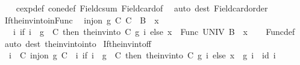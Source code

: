\begin{isabellebody}
%
\isadelimproof
\ \ %
\endisadelimproof
%
\isatagproof
{}\isamarkupfalse%
\ cexp{\isacharunderscore}{\kern0pt}def\ cone{\isacharunderscore}{\kern0pt}def\ Field{\isacharunderscore}{\kern0pt}csum\ Field{\isacharunderscore}{\kern0pt}card{\isacharunderscore}{\kern0pt}of\ \isamarkupfalse%
\ {\isacharparenleft}{\kern0pt}auto\ dest{\isacharcolon}{\kern0pt}\ Field{\isacharunderscore}{\kern0pt}card{\isacharunderscore}{\kern0pt}order{\isacharparenright}{\kern0pt}%
\endisatagproof
{\isafoldproof}%
%
\isadelimproof
\isanewline
%
\endisadelimproof
\isanewline
{}\isamarkupfalse%
\ If{\isacharunderscore}{\kern0pt}the{\isacharunderscore}{\kern0pt}inv{\isacharunderscore}{\kern0pt}into{\isacharunderscore}{\kern0pt}in{\isacharunderscore}{\kern0pt}Func{\isacharcolon}{\kern0pt}\isanewline
\ \ {\isachardoublequoteopen}{\isasymlbrakk}inj{\isacharunderscore}{\kern0pt}on\ g\ C{\isacharsemicolon}{\kern0pt}\ C\ {\isasymsubseteq}\ B\ {\isasymunion}\ {\isacharbraceleft}{\kern0pt}x{\isacharbraceright}{\kern0pt}{\isasymrbrakk}\ {\isasymLongrightarrow}\isanewline
\ \ \ {\isacharparenleft}{\kern0pt}{\isasymlambda}i{\isachardot}{\kern0pt}\ if\ i\ {\isasymin}\ g\ {\isacharbackquote}{\kern0pt}\ C\ then\ the{\isacharunderscore}{\kern0pt}inv{\isacharunderscore}{\kern0pt}into\ C\ g\ i\ else\ x{\isacharparenright}{\kern0pt}\ {\isasymin}\ Func\ UNIV\ {\isacharparenleft}{\kern0pt}B\ {\isasymunion}\ {\isacharbraceleft}{\kern0pt}x{\isacharbraceright}{\kern0pt}{\isacharparenright}{\kern0pt}{\isachardoublequoteclose}\isanewline
%
\isadelimproof
\ \ %
\endisadelimproof
%
\isatagproof
{}\isamarkupfalse%
\ Func{\isacharunderscore}{\kern0pt}def\ \isamarkupfalse%
\ {\isacharparenleft}{\kern0pt}auto\ dest{\isacharcolon}{\kern0pt}\ the{\isacharunderscore}{\kern0pt}inv{\isacharunderscore}{\kern0pt}into{\isacharunderscore}{\kern0pt}into{\isacharparenright}{\kern0pt}%
\endisatagproof
{\isafoldproof}%
%
\isadelimproof
\isanewline
%
\endisadelimproof
\isanewline
{}\isamarkupfalse%
\ If{\isacharunderscore}{\kern0pt}the{\isacharunderscore}{\kern0pt}inv{\isacharunderscore}{\kern0pt}into{\isacharunderscore}{\kern0pt}f{\isacharunderscore}{\kern0pt}f{\isacharcolon}{\kern0pt}\isanewline
\ \ {\isachardoublequoteopen}{\isasymlbrakk}i\ {\isasymin}\ C{\isacharsemicolon}{\kern0pt}\ inj{\isacharunderscore}{\kern0pt}on\ g\ C{\isasymrbrakk}\ {\isasymLongrightarrow}\ {\isacharparenleft}{\kern0pt}{\isacharparenleft}{\kern0pt}{\isasymlambda}i{\isachardot}{\kern0pt}\ if\ i\ {\isasymin}\ g\ {\isacharbackquote}{\kern0pt}\ C\ then\ the{\isacharunderscore}{\kern0pt}inv{\isacharunderscore}{\kern0pt}into\ C\ g\ i\ else\ x{\isacharparenright}{\kern0pt}\ {\isasymcirc}\ g{\isacharparenright}{\kern0pt}\ i\ {\isacharequal}{\kern0pt}\ id\ i{\isachardoublequoteclose}\isanewline

\end{isabellebody}
